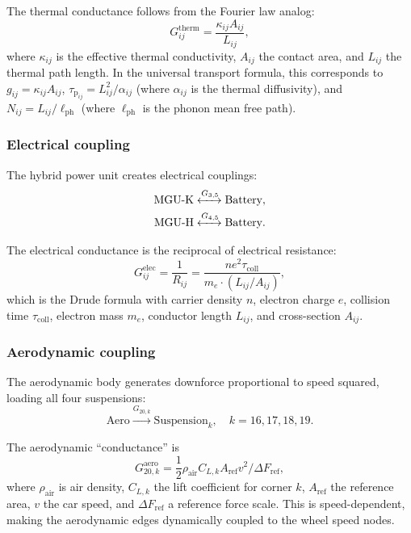 \documentclass[twocolumn,10pt,a4paper]{article}
\theoremstyle{definition}
\theoremstyle{remark}
\newcommand{\tauP}{\tau_{\mathrm{p}}}
\begin{document}
The thermal conductance follows from the Fourier law analog:
\begin{equation}\label{eq:thermal_G}
    G_{ij}^{\mathrm{therm}} = \frac{\kappa_{ij} A_{ij}}{L_{ij}},
\end{equation}
where $\kappa_{ij}$ is the effective thermal conductivity, $A_{ij}$ the contact area, and $L_{ij}$ the thermal path length. In the universal transport formula, this corresponds to $g_{ij} = \kappa_{ij} A_{ij}$, $\tauP_{ij} = L_{ij}^2 / \alpha_{ij}$ (where $\alpha_{ij}$ is the thermal diffusivity), and $N_{ij} = L_{ij} / \ell_{\mathrm{ph}}$ (where $\ell_{\mathrm{ph}}$ is the phonon mean free path).

\subsubsection{Electrical coupling}

The hybrid power unit creates electrical couplings:
\begin{align}
    \text{MGU-K} &\xleftrightarrow{G_{3,5}} \text{Battery}, \label{eq:mguk_elec} \\
    \text{MGU-H} &\xleftrightarrow{G_{4,5}} \text{Battery}. \label{eq:mguh_elec}
\end{align}

The electrical conductance is the reciprocal of electrical resistance:
\begin{equation}\label{eq:elec_G}
    G_{ij}^{\mathrm{elec}} = \frac{1}{R_{ij}} = \frac{n e^2 \tau_{\mathrm{coll}}}{m_e \cdot (L_{ij}/A_{ij})},
\end{equation}
which is the Drude formula \citep{Drude1900} with carrier density $n$, electron charge $e$, collision time $\tau_{\mathrm{coll}}$, electron mass $m_e$, conductor length $L_{ij}$, and cross-section $A_{ij}$.

\subsubsection{Aerodynamic coupling}

The aerodynamic body generates downforce proportional to speed squared, loading all four suspensions:
\begin{equation}\label{eq:aero_susp}
    \text{Aero} \xrightarrow{G_{20,k}} \text{Suspension}_k, \quad k = 16, 17, 18, 19.
\end{equation}

The aerodynamic ``conductance'' is
\begin{equation}\label{eq:aero_G}
    G_{20,k}^{\mathrm{aero}} = \frac{1}{2} \rho_{\mathrm{air}} C_{L,k} A_{\mathrm{ref}} v^2 / \Delta F_{\mathrm{ref}},
\end{equation}
where $\rho_{\mathrm{air}}$ is air density, $C_{L,k}$ the lift coefficient for corner $k$, $A_{\mathrm{ref}}$ the reference area, $v$ the car speed, and $\Delta F_{\mathrm{ref}}$ a reference force scale. This is speed-dependent, making the aerodynamic edges dynamically coupled to the wheel speed nodes.
\end{document}
